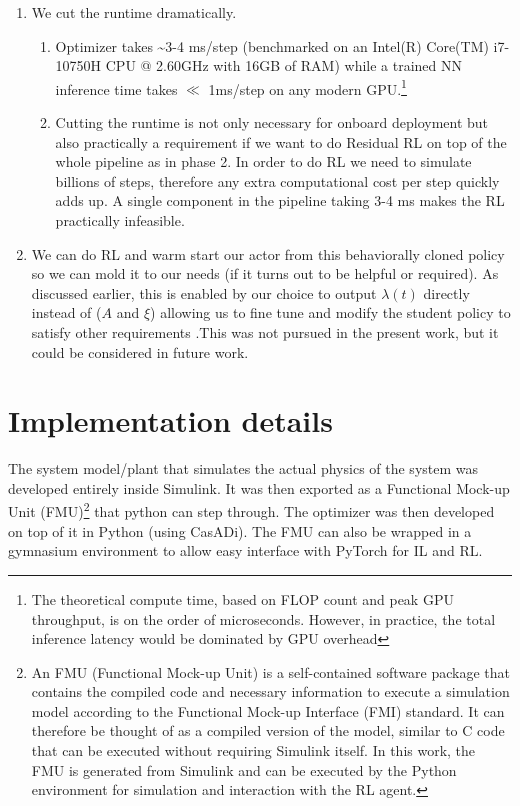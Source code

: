 \begin{enumerate}
  \item We cut the runtime dramatically.
  \begin{enumerate}[label=\arabic{enumi}.\arabic*]
    \item Optimizer takes
    \textasciitilde{}3-4 ms/step (benchmarked on an Intel(R) Core(TM)
    i7-10750H CPU @ 2.60GHz with 16GB of RAM) while a trained NN inference
    time takes $\ll$ 1ms/step on any modern
    GPU.\footnote{The theoretical compute time, based on FLOP count and
    peak GPU throughput, is on the order of microseconds. However, in
    practice, the total inference latency would be dominated by GPU
    overhead}
    \item Cutting the runtime is not only necessary for onboard deployment
    but also practically a requirement if we want to do Residual RL on top
    of the whole pipeline as in phase 2. In order to do RL we need to
    simulate billions of steps, therefore any extra computational cost per
    step quickly adds up. A single component in the pipeline taking 3-4 ms
    makes the RL practically infeasible.
  \end{enumerate}
  \item We can do RL and warm start our actor from this behaviorally
  cloned policy so we can mold it to our needs (if it turns out to be
  helpful or required). As discussed earlier, this is enabled by our choice
  to output $\lambda(t)$ directly instead of (\(A\) and \(\xi\)) allowing us to
  fine tune and modify the student policy to satisfy other requirements .This
  was not pursued in the present work, but it
  could be considered in future work.
\end{enumerate}

\section{Implementation details}

The system model/plant that simulates the actual physics of the system
was developed entirely inside Simulink. It was
then exported as a Functional Mock-up Unit (FMU)\footnote{An FMU
(Functional Mock-up Unit) is a self-contained software package that
contains the compiled code and necessary information to execute a
simulation model according to the Functional Mock-up Interface (FMI)
standard. It can therefore be thought of as a compiled version of the
model, similar to C code that can be executed without requiring
Simulink itself. In this work, the FMU is generated from Simulink and
can be executed by the Python environment for simulation and
interaction with the RL agent.} that python can step
through. The optimizer was then developed on top of it in Python (using
CasADi). The FMU can also be wrapped in a
gymnasium environment to allow easy interface with PyTorch for IL and
RL. 


